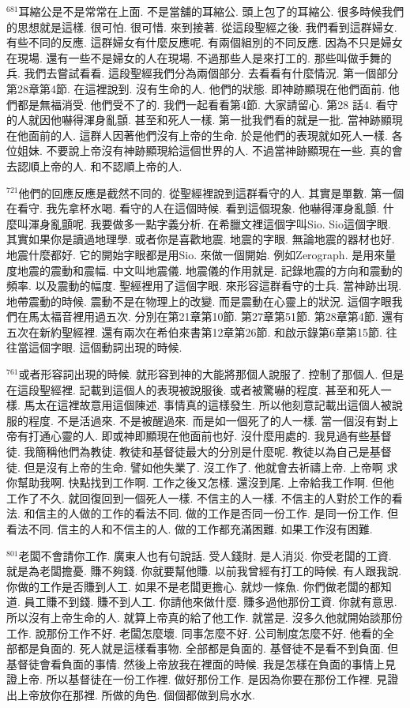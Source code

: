 \documentclass{book}
\begin{document}
$^{681}$耳縮公是不是常常在上面.
不是當舖的耳縮公.
頭上包了的耳縮公.
很多時候我們的思想就是這樣.
很可怕.
很可惜.
來到接著.
從這段聖經之後.
我們看到這群婦女.
有些不同的反應.
這群婦女有什麼反應呢.
有兩個組別的不同反應.
因為不只是婦女在現場.
還有一些不是婦女的人在現場.
不過那些人是來打工的.
那些叫做手舞的兵.
我們去嘗試看看.
這段聖經我們分為兩個部分.
去看看有什麼情況.
第一個部分第28章第4節.
在這裡說到.
沒有生命的人.
他們的狀態.
即神跡顯現在他們面前.
他們都是無福消受.
他們受不了的.
我們一起看看第4節.
大家請留心.
第28 話4.
看守的人就因他嚇得渾身亂顫.
甚至和死人一樣.
第一批我們看的就是一批.
當神跡顯現在他面前的人.
這群人因著他們沒有上帝的生命.
於是他們的表現就如死人一樣.
各位姐妹.
不要說上帝沒有神跡顯現給這個世界的人.
不過當神跡顯現在一些.
真的會去認順上帝的人.
和不認順上帝的人.

$^{721}$他們的回應反應是截然不同的.
從聖經裡說到這群看守的人.
其實是單數.
第一個在看守.
我先拿杯水喝.
看守的人在這個時候.
看到這個現象.
他嚇得渾身亂顫.
什麼叫渾身亂顫呢.
我要做多一點字義分析.
在希臘文裡這個字叫Sio.
Sio這個字眼.
其實如果你是讀過地理學.
或者你是喜歡地震.
地震的字眼.
無論地震的器材也好.
地震什麼都好.
它的開始字眼都是用Sio.
來做一個開始.
例如Zerograph.
是用來量度地震的震動和震幅.
中文叫地震儀.
地震儀的作用就是.
記錄地震的方向和震動的頻率.
以及震動的幅度.
聖經裡用了這個字眼.
來形容這群看守的士兵.
當神跡出現.
地帶震動的時候.
震動不是在物理上的改變.
而是震動在心靈上的狀況.
這個字眼我們在馬太福音裡用過五次.
分別在第21章第10節.
第27章第51節.
第28章第4節.
還有五次在新約聖經裡.
還有兩次在希伯來書第12章第26節.
和啟示錄第6章第15節.
往往當這個字眼.
這個動詞出現的時候.

$^{761}$或者形容詞出現的時候.
就形容到神的大能將那個人說服了.
控制了那個人.
但是在這段聖經裡.
記載到這個人的表現被說服後.
或者被驚嚇的程度.
甚至和死人一樣.
馬太在這裡故意用這個陳述.
事情真的這樣發生.
所以他刻意記載出這個人被說服的程度.
不是活過來.
不是被醒過來.
而是如一個死了的人一樣.
當一個沒有對上帝有打通心靈的人.
即或神即顯現在他面前也好.
沒什麼用處的.
我見過有些基督徒.
我簡稱他們為教徒.
教徒和基督徒最大的分別是什麼呢.
教徒以為自己是基督徒.
但是沒有上帝的生命.
譬如他失業了.
沒工作了.
他就會去祈禱上帝.
上帝啊 求你幫助我啊.
快點找到工作啊.
工作之後又怎樣.
還沒到尾.
上帝給我工作啊.
但他工作了不久.
就回復回到一個死人一樣.
不信主的人一樣.
不信主的人對於工作的看法.
和信主的人做的工作的看法不同.
做的工作是否同一份工作.
是同一份工作.
但看法不同.
信主的人和不信主的人.
做的工作都充滿困難.
如果工作沒有困難.

$^{801}$老闆不會請你工作.
廣東人也有句說話.
受人錢財.
是人消災.
你受老闆的工資.
就是為老闆擔憂.
賺不夠錢.
你就要幫他賺.
以前我曾經有打工的時候.
有人跟我說.
你做的工作是否賺到人工.
如果不是老闆更擔心.
就炒一條魚.
你們做老闆的都知道.
員工賺不到錢.
賺不到人工.
你請他來做什麼.
賺多過他那份工資.
你就有意思.
所以沒有上帝生命的人.
就算上帝真的給了他工作.
就當是.
沒多久他就開始談那份工作.
說那份工作不好.
老闆怎麼壞.
同事怎麼不好.
公司制度怎麼不好.
他看的全部都是負面的.
死人就是這樣看事物.
全部都是負面的.
基督徒不是看不到負面.
但基督徒會看負面的事情.
然後上帝放我在裡面的時候.
我是怎樣在負面的事情上見證上帝.
所以基督徒在一份工作裡.
做好那份工作.
是因為你要在那份工作裡.
見證出上帝放你在那裡.
所做的角色.
個個都做到烏水水.
\end{document}
